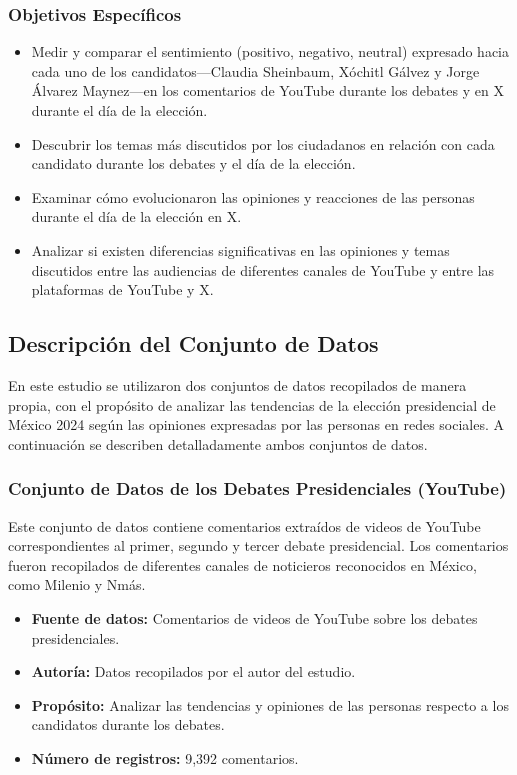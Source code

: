 \documentclass[10pt, a4paper]{article}
\begin{document}
	\subsubsection{Objetivos Específicos}
	\begin{itemize}
		\item Medir y comparar el sentimiento (positivo, negativo, neutral) expresado hacia cada uno de los candidatos—Claudia Sheinbaum, Xóchitl Gálvez y Jorge Álvarez Maynez—en los comentarios de YouTube durante los debates y en X durante el día de la elección.
		\item  Descubrir los temas más discutidos por los ciudadanos en relación con cada candidato durante los debates y el día de la elección.
		\item Examinar cómo evolucionaron las opiniones y reacciones de las personas durante el día de la elección en X.
		\item Analizar si existen diferencias significativas en las opiniones y temas discutidos entre las audiencias de diferentes canales de YouTube y entre las plataformas de YouTube y X.
	\end{itemize}
	
	\subsection{Descripción del Conjunto de Datos}
	
	En este estudio se utilizaron dos conjuntos de datos recopilados de manera propia, con el propósito de analizar las tendencias de la elección presidencial de México 2024 según las opiniones expresadas por las personas en redes sociales. A continuación se describen detalladamente ambos conjuntos de datos.
	
	\subsubsection{Conjunto de Datos de los Debates Presidenciales (YouTube)}
	
	Este conjunto de datos contiene comentarios extraídos de videos de YouTube correspondientes al primer, segundo y tercer debate presidencial. Los comentarios fueron recopilados de diferentes canales de noticieros reconocidos en México, como Milenio y Nmás.
	
	\begin{itemize}
		\item \textbf{Fuente de datos:} Comentarios de videos de YouTube sobre los debates presidenciales.
		\item \textbf{Autoría:} Datos recopilados por el autor del estudio.
		\item \textbf{Propósito:} Analizar las tendencias y opiniones de las personas respecto a los candidatos durante los debates.
		\item \textbf{Número de registros:} 9,392 comentarios.
	\end{itemize}
	
\end{document}
